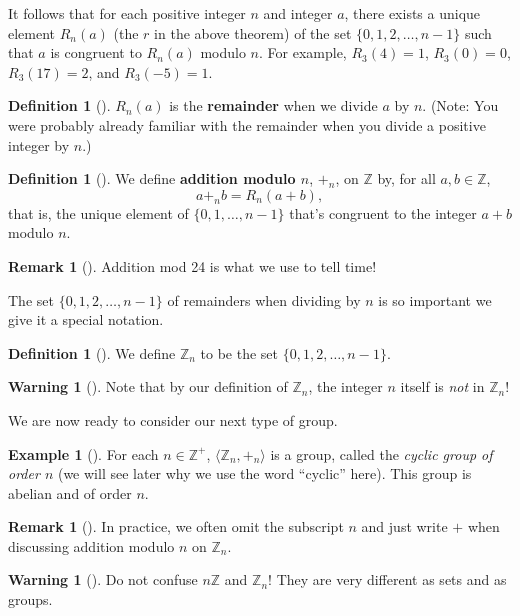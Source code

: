 \documentclass[10pt,]{book}
\newcommand{\terminology}[1]{\textbf{#1}}
\theoremstyle{plain}
\theoremstyle{definition}
\newtheorem{definition}[theorem]{Definition}
\theoremstyle{definition}
\newtheorem{remark}[theorem]{Remark}
\newtheorem{warning}[theorem]{Warning}
\theoremstyle{definition}
\newtheorem{example}[theorem]{Example}
\theoremstyle{definition}
\numberwithin{equation}{section}
\def\Z{\mathbb{Z}}
\begin{document}
It follows that for each positive integer \(n\) and integer \(a\), there exists a unique element \(R_n(a)\) (the \(r\) in the above theorem) of the set \(\{0,1,2,\ldots, n-1\}\) such that \(a\) is congruent to \(R_n(a)\) modulo \(n\). For example, \(R_3(4)=1\), \(R_3(0)=0\), \(R_3(17)=2\), and \(R_3(-5)=1\).%
\begin{definition}[{}]\label{definition-25}
\label{notation-40}
\(R_n(a)\) is the \terminology{remainder} when we divide \(a\) by \(n\). (Note: You were probably already familiar with the remainder when you divide a positive integer by \(n\).)%
\end{definition}
\begin{definition}[{}]\label{definition-26}
\label{notation-41}
We define \terminology{addition modulo \(n\)}, \(+_n\), on \(\Z\) by, for all \(a,b\in \Z\),%
\begin{equation*}
a+_n b=R_n(a+b),
\end{equation*}
that is, the unique element of \(\{0,1,\ldots, n-1\}\) that's congruent to the integer \(a+b\) modulo \(n\).%
\end{definition}
\begin{remark}[]\label{remark-13}
Addition mod 24 is what we use to tell time!%
\end{remark}
The set \(\{0,1,2,\ldots, n-1\}\) of remainders when dividing by \(n\) is so important we give it a special notation.%
\begin{definition}[{}]\label{definition-27}
We define \(\Z_n\) to be the set \(\{0,1,2,\ldots,n-1\}\).%
\end{definition}
\begin{warning}[]\label{warning-10}
Note that by our definition of \(\Z_n\), the integer \(n\) itself is \emph{not} in \(\Z_n\)!%
\end{warning}
We are now ready to consider our next type of group.%
\begin{example}[]\label{example-18}
\label{notation-42}
 For each \(n\in \Z^+\), \(\langle \Z_n,+_n\rangle\) is a group, called the \emph{cyclic group of order \(n\)} (we will see later why we use the word ``cyclic'' here). This group is abelian and of order \(n\).%
\end{example}
\begin{remark}[]\label{remark-14}
In practice, we often omit the subscript \(n\) and just write \(+\) when discussing addition modulo \(n\) on \(\Z_n\).%
\end{remark}
\begin{warning}[]\label{warning-11}
Do not confuse \(n\Z\) and \(\Z_n\)! They are very different as sets and as groups.%
\end{warning}
\end{document}
